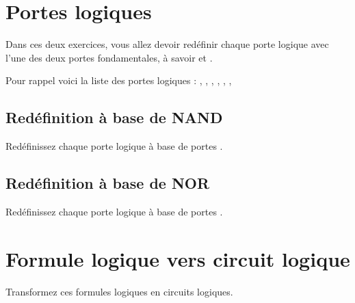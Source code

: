 \documentclass[11pt,a4paper]{article}
\begin{document}
\section{Portes logiques}

\medskip

Dans ces deux exercices, vous allez devoir redéfinir chaque porte logique avec l'une des deux portes fondamentales, à savoir  et .

\medskip

Pour rappel voici la liste des portes logiques : , , , , , , 

\medskip

\begin{center}
\begin{table}[ht!]
  \centering
  \begin{minipage}{0.45\textwidth}

\subsection{Redéfinition à base de NAND}

Redéfinissez chaque porte logique à base de portes .

  \end{minipage}
  \hfillx
  \begin{minipage}{0.45\textwidth}

\subsection{Redéfinition à base de NOR}

Redéfinissez chaque porte logique à base de portes .

  \end{minipage}
\end{table}
\end{center}




\section{Formule logique vers circuit logique}

\medskip

Transformez ces formules logiques en circuits logiques.
\end{document}
